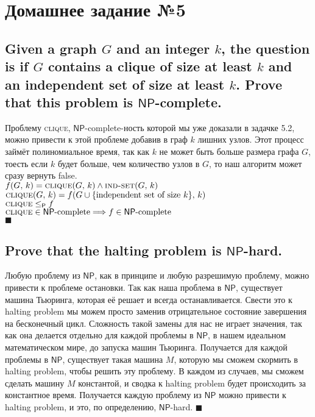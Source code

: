 \documentclass{article}
\newcommand{\NP}{\ensuremath{\mathsf{NP}}}
\renewcommand{\P}{\ensuremath{\mathsf{P}}}
\begin{document}
  \section{Домашнее задание №5}
  \setcounter{subsection}{6}
  \subsection{Given a graph $G$ and an integer $k$, the question is if $G$ contains a clique of size at least $k$ and an independent set of size at least $k$. Prove that this problem is \NP-complete.}
  Проблему \textsc{clique}, \NP-complete-ность которой мы уже доказали в задачке 5.2, можно привести к этой проблеме добавив в граф $k$ лишних узлов.
  Этот процесс займёт полиномиальное время, так как $k$ не может быть больше размера графа $G$, тоесть если $k$ будет больше, чем количество узлов в $G$, то наш алгоритм может сразу вернуть false. \\
  $\displaystyle f(G,\, k) = \textsc{clique}(G,\, k) \land \textsc{ind-set}(G,\, k)$ \\
  $\displaystyle \textsc{clique}(G,\, k) = f(G \cup \{\textrm{independent set of size } k\},\, k)$ \\
  $\ds \textsc{clique} \leq_\P f$ \\
  $\ds \textsc{clique} \in \NP\textrm{-complete} \Longrightarrow f \in \NP\textrm{-complete}$ \\
  $\blacksquare$

  \subsection{Prove that the halting problem is \NP-hard.}
  Любую проблему из \NP, как в принципе и любую разрешимую проблему, можно привести к проблеме остановки.
  Так как наша проблема в \NP, существует машина Тьюринга, которая её решает и всегда останавливается.
  Свести это к halting problem мы можем просто заменив отрицательное состояние завершения на бесконечный цикл.
  Сложность такой замены для нас не играет значения, так как она делается отдельно для каждой проблемы в \NP, в нашем идеальном математическом мире, до запуска машин Тьюринга.
  Получается для каждой проблемы в \NP, существует такая машина $M$, которую мы сможем скормить в halting problem, чтобы решить эту проблему.
  В каждом из случаев, мы сможем сделать машину $M$ константой, и сводка к halting problem будет происходить за константное время.
  Получается каждую проблему из \NP{} можно привести к halting problem, и это, по определению, \NP-hard.
  $\blacksquare$
\end{document}
